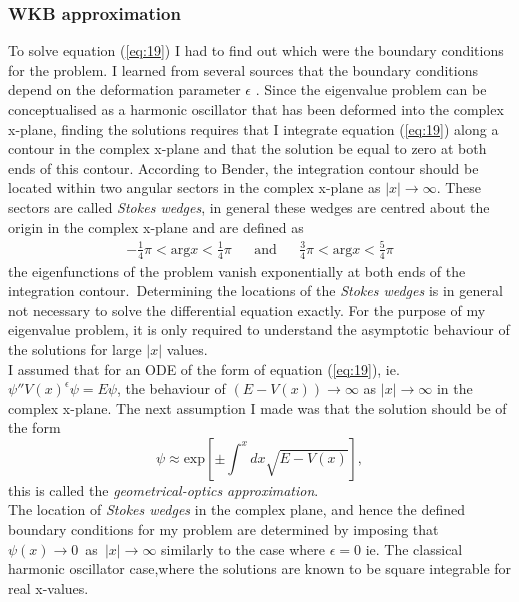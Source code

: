\documentclass[10pt, a4paper, singlespacing, headsepline]{article}
\begin{document}
\subsubsection{WKB approximation}
To solve equation (\ref{eq:19}) I had to find out which were the boundary conditions for the problem. I learned from several sources that the boundary conditions depend on the deformation parameter $\epsilon$ \cite{BenderPT}\cite{Bender}\cite{Bender2017}. Since the eigenvalue problem can be conceptualised as a harmonic oscillator that has been deformed into the complex x-plane, finding the solutions requires that I integrate equation (\ref{eq:19}) along a contour in the complex x-plane and that the solution be equal to zero at both ends of this contour\cite{BenderPT}. According to Bender, the integration contour should be located within two angular sectors in the complex x-plane as $|x| \rightarrow \infty$. These sectors are called \textit{Stokes wedges}\cite{BenderPT}\cite{Bender}, in general these wedges are centred about the origin in the complex x-plane and are defined as 
\begin{align} \label{eq:20}
&-\frac{1}{4} \pi  < \mathrm{arg}x < \frac{1}{4}\pi& &\mathrm{and}& &\frac{3}{4} \pi  < \mathrm{arg}x < \frac{5}{4}\pi& 
\end{align}
the eigenfunctions of the problem vanish exponentially at both ends of the integration contour.\
Determining the locations of the \textit{Stokes wedges} is in general not necessary to solve the differential equation exactly\cite{BenderPT}. For the purpose of my eigenvalue problem, it is only required to understand the asymptotic behaviour of the solutions for large $|x|$ values.\\
I assumed that for an ODE of the form of equation (\ref{eq:19}), ie. \mbox{$\psi'' V(x)^{\epsilon} \psi = E \psi$}, the behaviour of $(E - V(x)) \rightarrow \infty$ as $|x| \rightarrow \infty$ in the complex x-plane. The next assumption I made was that the solution should be of the form
\begin{equation} \label{eq:21}
\mbox{$\psi \approx \mathrm{exp}[\pm  \int^{x}dx \sqrt{E - V(x)}]$},
\end{equation}
this is called the \textit{geometrical-optics approximation}\cite{BenderPT}.\\ 
The location of \textit{Stokes wedges} in the complex plane, and hence the defined boundary conditions for my problem are determined by imposing that \mbox{$\psi(x) \rightarrow 0$ as $|x| \rightarrow \infty$} similarly to the case where $\epsilon = 0$ ie. The classical harmonic oscillator case,where the solutions are known to be square integrable for real x-values.\\
\end{document}
